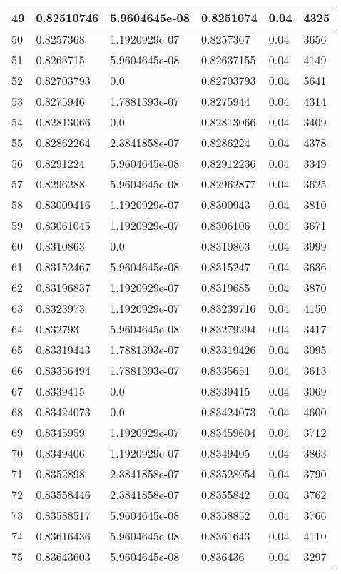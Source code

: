 \begin{longtable}{|l|l|l|l|l|l|}
49 & 0.82510746 & 5.9604645e-08 & 0.8251074 & 0.04 & 4325 \\ \hline 
50 & 0.8257368 & 1.1920929e-07 & 0.8257367 & 0.04 & 3656 \\ \hline 
51 & 0.8263715 & 5.9604645e-08 & 0.82637155 & 0.04 & 4149 \\ \hline 
52 & 0.82703793 & 0.0 & 0.82703793 & 0.04 & 5641 \\ \hline 
53 & 0.8275946 & 1.7881393e-07 & 0.8275944 & 0.04 & 4314 \\ \hline 
54 & 0.82813066 & 0.0 & 0.82813066 & 0.04 & 3409 \\ \hline 
55 & 0.82862264 & 2.3841858e-07 & 0.8286224 & 0.04 & 4378 \\ \hline 
56 & 0.8291224 & 5.9604645e-08 & 0.82912236 & 0.04 & 3349 \\ \hline 
57 & 0.8296288 & 5.9604645e-08 & 0.82962877 & 0.04 & 3625 \\ \hline 
58 & 0.83009416 & 1.1920929e-07 & 0.8300943 & 0.04 & 3810 \\ \hline 
59 & 0.83061045 & 1.1920929e-07 & 0.8306106 & 0.04 & 3671 \\ \hline 
60 & 0.8310863 & 0.0 & 0.8310863 & 0.04 & 3999 \\ \hline 
61 & 0.83152467 & 5.9604645e-08 & 0.8315247 & 0.04 & 3636 \\ \hline 
62 & 0.83196837 & 1.1920929e-07 & 0.8319685 & 0.04 & 3870 \\ \hline 
63 & 0.8323973 & 1.1920929e-07 & 0.83239716 & 0.04 & 4150 \\ \hline 
64 & 0.832793 & 5.9604645e-08 & 0.83279294 & 0.04 & 3417 \\ \hline 
65 & 0.83319443 & 1.7881393e-07 & 0.83319426 & 0.04 & 3095 \\ \hline 
66 & 0.83356494 & 1.7881393e-07 & 0.8335651 & 0.04 & 3613 \\ \hline 
67 & 0.8339415 & 0.0 & 0.8339415 & 0.04 & 3069 \\ \hline 
68 & 0.83424073 & 0.0 & 0.83424073 & 0.04 & 4600 \\ \hline 
69 & 0.8345959 & 1.1920929e-07 & 0.83459604 & 0.04 & 3712 \\ \hline 
70 & 0.8349406 & 1.1920929e-07 & 0.8349405 & 0.04 & 3863 \\ \hline 
71 & 0.8352898 & 2.3841858e-07 & 0.83528954 & 0.04 & 3790 \\ \hline 
72 & 0.83558446 & 2.3841858e-07 & 0.8355842 & 0.04 & 3762 \\ \hline 
73 & 0.83588517 & 5.9604645e-08 & 0.8358852 & 0.04 & 3766 \\ \hline 
74 & 0.83616436 & 5.9604645e-08 & 0.8361643 & 0.04 & 4110 \\ \hline 
75 & 0.83643603 & 5.9604645e-08 & 0.836436 & 0.04 & 3297 \\ \hline 
\end{longtable}